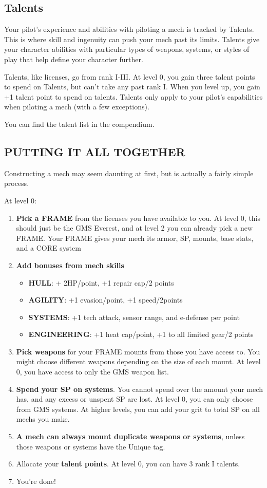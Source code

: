 \subsection{Talents}

Your pilot's experience and abilities with piloting a mech is tracked by Talents. This is where skill and ingenuity can push your mech past its limits. Talents give your character abilities with particular types of weapons, systems, or styles of play that help define your character further. 

Talents, like licenses, go from rank I-III. At level 0, you gain three talent points to spend on Talents, but can't take any past rank I. When you level up, you gain +1 talent point to spend on talents. Talents only apply to your pilot's capabilities when piloting a mech (with a few exceptions). 

You can find the talent list in the compendium.

\subsection*{PUTTING IT ALL TOGETHER}

Constructing a mech may seem daunting at first, but is actually a fairly simple process.

At level 0:
\begin{enumerate}
\item \textbf{Pick a FRAME} from the licenses you have available to you. At level 0, this should just be the GMS Everest, and at level 2 you can already pick a new FRAME. Your FRAME gives your mech its armor, SP, mounts, base stats, and a CORE system
\item \textbf{Add bonuses from mech skills}
\begin{itemize}
\item \textbf{HULL}: + 2HP/point, +1 repair cap/2 points
\item \textbf{AGILITY}: +1 evasion/point, +1 speed/2points
\item \textbf{SYSTEMS}: +1 tech attack, sensor range, and e-defense per point
\item \textbf{ENGINEERING}: +1 heat cap/point, +1 to all limited gear/2 points
\end{itemize}
\item \textbf{Pick weapons} for your FRAME mounts from those you have access to. You might choose different weapons depending on the size of each mount. At level 0, you have access to only the GMS weapon list.
\item \textbf{Spend your SP on systems}. You cannot spend over the amount your mech has, and any excess or unspent SP are lost. At level 0, you can only choose from GMS systems. At higher levels, you can add your grit to total SP on all mechs you make.
\item \textbf{A mech can always mount duplicate weapons or systems}, unless those weapons or systems have the Unique tag.
\item Allocate your \textbf{talent points}. At level 0, you can have 3 rank I talents.
\item You're done!
\end{enumerate}  

